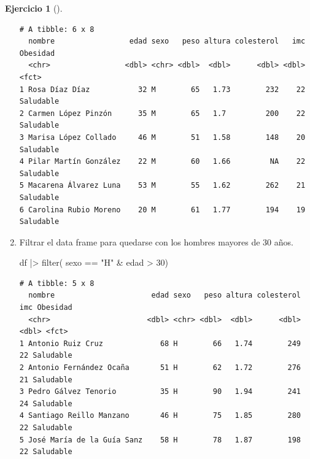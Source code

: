 \documentclass[
  a4paper,
]{scrreport}
\newenvironment{Shaded}{\begin{snugshade}}{\end{snugshade}}
\newcommand{\DecValTok}[1]{\textcolor[rgb]{0.68,0.00,0.00}{#1}}
\newcommand{\FunctionTok}[1]{\textcolor[rgb]{0.28,0.35,0.67}{#1}}
\newcommand{\NormalTok}[1]{\textcolor[rgb]{0.00,0.23,0.31}{#1}}
\newcommand{\SpecialCharTok}[1]{\textcolor[rgb]{0.37,0.37,0.37}{#1}}
\newcommand{\StringTok}[1]{\textcolor[rgb]{0.13,0.47,0.30}{#1}}
\theoremstyle{definition}
\newtheorem{exercise}{Ejercicio}[chapter]
\theoremstyle{remark}
\begin{document}
\begin{exercise}[]
\begin{enumerate}
\begin{tcolorbox}
\begin{verbatim}
# A tibble: 6 x 8
  nombre                 edad sexo   peso altura colesterol   imc Obesidad 
  <chr>                 <dbl> <chr> <dbl>  <dbl>      <dbl> <dbl> <fct>    
1 Rosa Díaz Díaz           32 M        65   1.73        232    22 Saludable
2 Carmen López Pinzón      35 M        65   1.7         200    22 Saludable
3 Marisa López Collado     46 M        51   1.58        148    20 Saludable
4 Pilar Martín González    22 M        60   1.66         NA    22 Saludable
5 Macarena Álvarez Luna    53 M        55   1.62        262    21 Saludable
6 Carolina Rubio Moreno    20 M        61   1.77        194    19 Saludable
\end{verbatim}

  \end{tcolorbox}
\item
  Filtrar el data frame para quedarse con los hombres mayores de 30
  años.

  \begin{tcolorbox}[enhanced jigsaw, toprule=.15mm, rightrule=.15mm, arc=.35mm, colback=white, colbacktitle=quarto-callout-tip-color!10!white, toptitle=1mm, left=2mm, colframe=quarto-callout-tip-color-frame, opacityback=0, breakable, opacitybacktitle=0.6, bottomtitle=1mm, titlerule=0mm, title=\textcolor{quarto-callout-tip-color}{\faLightbulb}\hspace{0.5em}{Solución}, bottomrule=.15mm, coltitle=black, leftrule=.75mm]

\begin{Shaded}
\begin{Highlighting}[]
\NormalTok{df }\SpecialCharTok{|\textgreater{}}
    \FunctionTok{filter}\NormalTok{( sexo }\SpecialCharTok{==} \StringTok{"H"} \SpecialCharTok{\&}\NormalTok{ edad }\SpecialCharTok{\textgreater{}} \DecValTok{30}\NormalTok{)}
\end{Highlighting}
\end{Shaded}

\begin{verbatim}
# A tibble: 5 x 8
  nombre                      edad sexo   peso altura colesterol   imc Obesidad 
  <chr>                      <dbl> <chr> <dbl>  <dbl>      <dbl> <dbl> <fct>    
1 Antonio Ruiz Cruz             68 H        66   1.74        249    22 Saludable
2 Antonio Fernández Ocaña       51 H        62   1.72        276    21 Saludable
3 Pedro Gálvez Tenorio          35 H        90   1.94        241    24 Saludable
4 Santiago Reillo Manzano       46 H        75   1.85        280    22 Saludable
5 José María de la Guía Sanz    58 H        78   1.87        198    22 Saludable
\end{verbatim}


\end{tcolorbox}
\end{enumerate}
\end{exercise}
\end{document}
